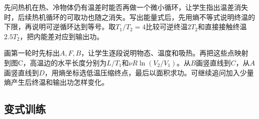 \documentclass[UTF8,fontset=fandol,a4paper,11pt]{ctexart}
\begin{document}
先问热机在热、冷物体仍有温差时能否再做一个微小循环，让学生指出温差消失时，后续热机循环的可取功也随之消失。写出能量式后，先用熵不等式说明终温的下限，再说明可逆循环达到等号。取$T_1/T_2=4$比较可逆终温$2T_2$和直接接触终温$2.5T_2$，把内能差对应到输出功。

画第一轮时先标出$A,F,B$，让学生逐段说明物态、温度和吸热。再把这些点映射到图C，高温边的水平长度分别为$L/T_1$和$\nu R\ln(V_2/V_1)$。从$B$画竖直线到$C$，从$A$画竖直线到$D$，用熵坐标选低温压缩终点，最后以面积求功。可继续追问加入少量熵产生后终温和输出功怎样变化。



\subsection*{变式训练}
\end{document}
